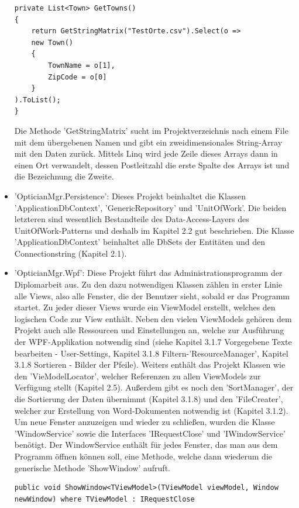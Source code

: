 \begin{itemize}
\begin{lstlisting} 
private List<Town> GetTowns()
{
	return GetStringMatrix("TestOrte.csv").Select(o =>
	new Town()
	{
		TownName = o[1],
		ZipCode = o[0]
	}
).ToList();
}\end{lstlisting} Die Methode 'GetStringMatrix' sucht im Projektverzeichnis nach einem File mit dem übergebenen Namen und gibt ein zweidimensionales String-Array mit den Daten zurück. Mittels Linq wird jede Zeile dieses Arrays dann in einen Ort verwandelt, dessen Postleitzahl die erste Spalte des Arrays ist und die Bezeichnung die Zweite.
\item 'OpticianMgr.Persistence': Dieses Projekt beinhaltet die Klassen 'ApplicationDbContext', 'GenericRepository' und 'UnitOfWork'. Die beiden letzteren sind wesentlich Bestandteile des Data-Access-Layers des UnitOfWork-Patterns und deshalb im Kapitel 2.2 gut beschrieben. Die Klasse 'ApplicationDbContext' beinhaltet alle DbSets der Entitäten und den Connectionstring (Kapitel 2.1).
\item 'OpticianMgr.Wpf': Diese Projekt führt das Administrationsprogramm der Diplomarbeit aus. Zu den dazu notwendigen Klassen zählen in erster Linie alle Views, also alle Fenster, die der Benutzer sieht, sobald er das Programm startet. Zu jeder dieser Views wurde ein ViewModel erstellt, welches den logischen Code zur View enthält. Neben den vielen ViewModels gehören dem Projekt auch alle Ressourcen und Einstellungen an, welche zur Ausführung der WPF-Applikation notwendig sind (siehe Kapitel 3.1.7 Vorgegebene Texte bearbeiten - User-Settings, Kapitel 3.1.8 Filtern-'ResourceManager', Kapitel 3.1.8 Sortieren - Bilder der Pfeile). \newline Weiters enthält das Projekt Klassen wie den 'VieModelLocator', welcher Referenzen zu allen ViewModels zur Verfügung stellt (Kapitel 2.5).  Außerdem gibt es noch den 'SortManager', der die Sortierung der Daten übernimmt (Kapitel 3.1.8) und den 'FileCreater', welcher zur Erstellung von Word-Dokumenten notwendig ist (Kapitel 3.1.2). \newline Um neue Fenster anzuzeigen und wieder zu schließen, wurden die Klasse 'WindowService' sowie die Interfaces 'IRequestClose' und 'IWindowService' benötigt. Der WindowService enthält für jedes Fenster, das man aus dem Programm öffnen können soll, eine Methode, welche dann wiederum die generische Methode 'ShowWindow' aufruft.
\begin{lstlisting}
public void ShowWindow<TViewModel>(TViewModel viewModel, Window newWindow) where TViewModel : IRequestClose

\end{lstlisting}
\end{itemize}
